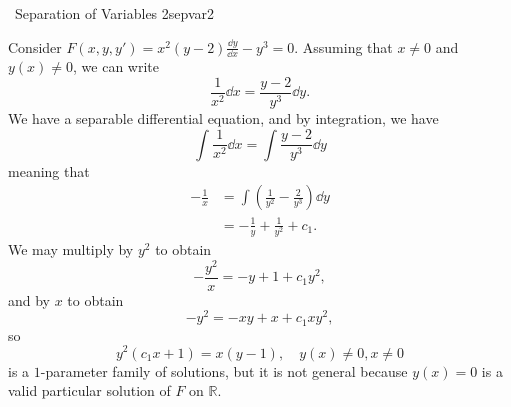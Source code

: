     \begin{example}{\Difficulty\,\Difficulty\,\,Separation of Variables 2}{sepvar2}

        Consider \(F(x,y,y')=x^2(y-2)\frac{\dd y}{\dd x}-y^3=0\). Assuming that \(x\neq0\) and \(y(x)\neq0\), we can write
        \begin{equation*}
            \frac{1}{x^2}\dd x=\frac{y-2}{y^3}\dd y.
        \end{equation*}
        We have a separable differential equation, and by integration, we have
        \begin{equation*}
            \int \frac{1}{x^2}\dd x=\int \frac{y-2}{y^3}\dd y
        \end{equation*}
        meaning that
        \begin{align*}
            -\frac{1}{x}&=\int \left(\frac{1}{y^2}-\frac{2}{y^3} \right)\dd y \\
            &=-\frac{1}{y}+\frac{1}{y^2}+c_1.
        \end{align*}
        We may multiply by \(y^2\) to obtain
        \begin{equation*}
            -\frac{y^2}{x}=-y+1+c_1y^2,
        \end{equation*}
        and by \(x\) to obtain
        \begin{equation*}
            -y^2=-xy+x+c_1xy^2,
        \end{equation*}
        so
        \begin{equation*}
            y^2(c_1x+1)=x(y-1),\quad y(x)\neq 0,x\neq 0
        \end{equation*}
        is a \(1\)-parameter family of solutions, but it is not general because \(y(x)=0\) is a valid particular solution of \(F\) on \(\mathbb{R}\).
    \end{example}

